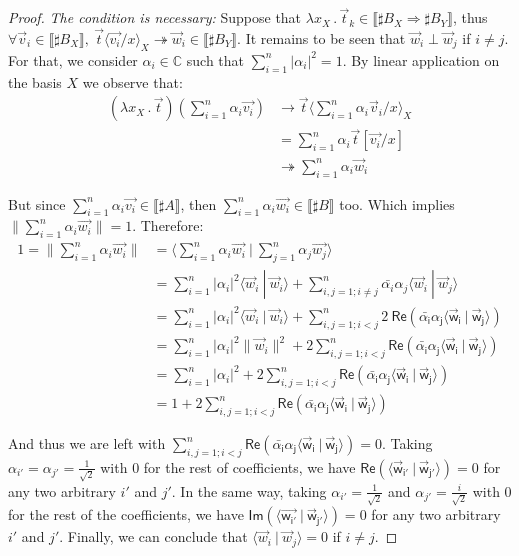 \documentclass[runningheads,orivec]{llncs}
\newcommand\Rpart[1]{\mathsf{Re(#1)}}
\newcommand\Ipart[1]{\mathsf{Im(#1)}}
\newcommand\ansubst[2]{\ensuremath{\langle #1 \rangle_{#2}}}
\def\C{\mathbb{C}}            %
\def\scal#1#2{\langle{#1}~|~{#2}\rangle}
\def\Lam#1#2#3{\lambda#1_{#2}\,{.}\,#3} %
\def\eval{\twoheadrightarrow}
\def\Arr{\Rightarrow}
\def\sem#1{\llbracket#1\rrbracket}
\newcommand\basis[1]{\ensuremath{B_{ #1 }}}
\begin{document}
\begin{proof}
  \textit{The condition is necessary:} Suppose that $\Lam{x}{X}{\vec t_k}\in\sem{\sharp\basis{X}\Arr\sharp\basis{Y}}$, thus $\forall \vec v_i\in\sem{\sharp\basis{X}},\ \vec{t}\ansubst{\vec{v_i}/x}{X}\eval\vec w_i\in\sem{\sharp\basis{Y}}$. It remains to be seen that $\vec w_i \perp \vec w_j$ if $i\neq j$. For that, we consider $\alpha_i\in\C$ such that $\sum_{i=1}^n |\alpha_i|^2 = 1$. By linear application on the basis $X$ we observe that:
  \begin{align*}
    (\Lam{x}{X}{\vec{t}})(\sum_{i=1}^n \alpha_i \vec{v_i}) &\to \vec t\ansubst{\sum_{i=1}^n \alpha_i \vec v_i/x}{X}\\
    &= \sum_{i=1}^{n} \alpha_i \vec{t}[\vec{v_i}/x]\\ 
    &\twoheadrightarrow \sum_{i=1}^n \alpha_i \vec w_i
  \end{align*}

  But since $\sum_{i=1}^n \alpha_i \vec{v_i}\in\sem{\sharp A}$, then $\sum_{i=1}^n \alpha_i \vec{w_i}\in\sem{\sharp B}$ too. Which implies $\|\sum_{i=1}^n \alpha_i \vec{w_i}\|=1$. Therefore:
  \begin{align*}
    1 = \|\sum_{i=1}^n \alpha_i \vec{w_i}\| &= \scal{\sum_{i=1}^n \alpha_i \vec{w_i}}{\sum_{j=1}^n \alpha_j \vec{w_j}}\\
    &=\sum_{i=1}^n |\alpha_i|^2 \scal{\vec w_i}{\vec w_i } + \sum_{i,j=1; i\neq j}^n \bar{\alpha_i}\alpha_j \scal{\vec w_i}{\vec w_j}\\
    &=\sum_{i=1}^n |\alpha_i|^2 \scal{\vec w_i}{\vec w_i } + \sum_{i,j=1; i<j}^n 2~\Rpart{\bar{\alpha_i}\alpha_j \scal{\vec w_i}{\vec w_j}}\\
    &=\sum_{i=1}^n |\alpha_i|^2 \|\vec w_i\|^2 + 2\sum_{i,j=1; i<j}^n \Rpart{\bar{\alpha_i}\alpha_j \scal{\vec w_i}{\vec w_j}}\\
    &=\sum_{i=1}^n |\alpha_i|^2 + 2\sum_{i,j=1; i<j}^n\Rpart{\bar{\alpha_i}\alpha_j \scal{\vec w_i}{\vec w_j}}\\
    &= 1 + 2\sum_{i,j=1; i<j}^n \Rpart{\bar{\alpha_i}\alpha_j \scal{\vec w_i}{\vec w_j}}
  \end{align*}

  And thus we are left with $\sum_{i,j=1; i<j}^n \Rpart{\bar{\alpha_i}\alpha_j \scal{\vec w_i}{\vec w_j}} = 0$. Taking $\alpha_{i'} = \alpha_{j'} = \frac{1}{\sqrt{2}}$ with $0$ for the rest of coefficients, we have $\Rpart{\scal{\vec w_{i'}}{\vec w_{j'}}} = 0$ for any two arbitrary $i'$ and $j'$. In the same way, taking $\alpha_{i'} = \frac{1}{\sqrt{2}}$ and $\alpha_{j'}=\frac{i}{\sqrt{2}}$ with $0$ for the rest of the coefficients, we have $\Ipart{\scal{\vec{w_{i'}}}{\vec w_{j'}}} = 0$ for any two arbitrary $i'$ and $j'$. Finally, we can conclude that $\scal{\vec w_i}{\vec w_j}=0$ if $i\neq j$.


\end{proof}
\end{document}
